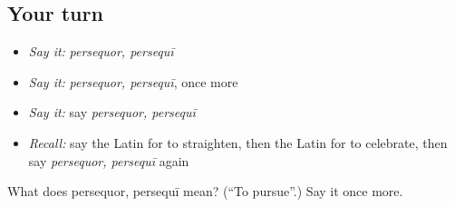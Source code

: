 \subsection*{Your turn}
\begin{itemize}
\raggedright
  \item \emph{Say it:} \emph{persequor, persequī}
  \item \emph{Say it:} \emph{persequor, persequī}, once more
  \item \emph{Say it:} say \emph{persequor, persequī}
  \item \emph{Recall:} say the Latin for to straighten, then the Latin for to celebrate, then say \emph{persequor, persequī} again
\end{itemize}

\begin{tcolorbox}[breakable,colback=teal!4,colframe=teal!35!black,title={Before you move on}]
What does persequor, persequī mean? (\textquotedblleft{}To pursue\textquotedblright{}.) Say it once more.
\end{tcolorbox}
